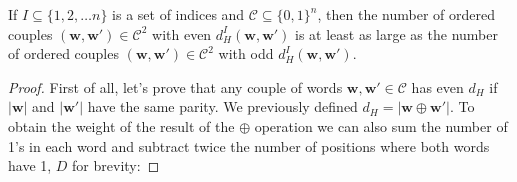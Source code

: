 \begin{lemma}
    \label{even-geq-odd}
    If $I \subseteq \{1,2,\ldots n\}$ is a set of indices and $\mathcal{C} \subseteq \{0,1\}^n$, then the number of ordered couples $(\mathbf{w}, \mathbf{w}') \in \mathcal{C}^2$ with even $d_H^I(\mathbf{w}, \mathbf{w}')$ is at least as large as the number of ordered couples $(\mathbf{w}, \mathbf{w}') \in \mathcal{C}^2$ with odd $d_H^I(\mathbf{w}, \mathbf{w}')$.
    \begin{proof}
        First of all, let's prove that any couple of words $\mathbf{w}, \mathbf{w}' \in \mathcal{C}$ has even $d_H$ if $|\mathbf{w}|$ and $|\mathbf{w}'|$ have the same parity.
        We previously defined $d_H=|\textbf{w} \oplus \textbf{w}'|$. To obtain the weight of the result of the $\oplus$ operation we can also sum the number of 1's in each word and subtract twice the number of positions where both words have 1, $D$ for brevity:
        

\end{proof}
\end{lemma}
